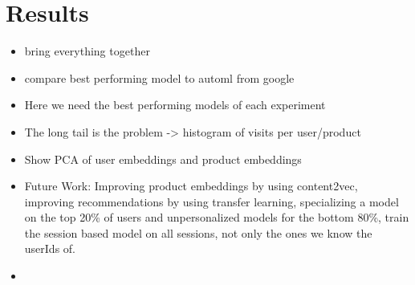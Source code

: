 \chapter{Results}
\begin{itemize}
\item bring everything together
\item compare best performing model to automl from google
\item Here we need the best performing models of each experiment
\item The long tail is the problem -> histogram of visits per user/product
\item Show PCA of user embeddings and product embeddings
\item Future Work: Improving product embeddings by using content2vec, improving recommendations by using transfer learning, specializing a model on the top 20\% of users and unpersonalized models for the bottom 80\%, train the session based model on all sessions, not only the ones we know the userIds of.
\item 
\end{itemize}